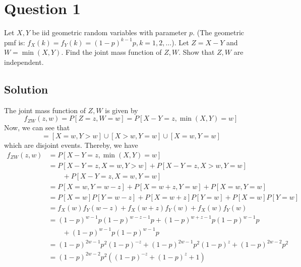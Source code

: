 \section*{Question 1}
\setcounter{section}{1}
\setcounter{equation}{0}

Let \( X, Y \) be iid geometric random variables with parameter \( p \).
(The geometric pmf is: \( f_{X}(k)=f_{Y}(k)={(1-p)}^{k-1} p, k=1,2, \dots \)).
Let \( Z=X-Y \) and \( W=\min (X, Y) \).
Find the joint mass function of \( Z, W \).
Show that \( Z, W \) are independent.

\subsection*{Solution}

The joint mass function of \( Z, W \) is given by
\begin{equation*}
    f_{ZW}(z, w)
    =
    P[Z=z, W=w]
    =
    P[X-Y=z, \min (X, Y)=w]
\end{equation*}
Now, we can see that
\begin{equation}
    [\min (X, Y)=w]
    =
    [X=w, Y>w] \cup [X>w, Y=w] \cup [X=w, Y=w]
\end{equation}
which are disjoint events.
Thereby, we have
\begin{align*}
    f_{ZW}(z, w)
     & =
    P[X-Y=z, \min (X, Y)=w]
    \\ & =
    P[X-Y=z, X=w, Y>w]
    + P[X-Y=z, X>w, Y=w]
    \\ & \qquad
    + P[X-Y=z, X=w, Y=w]
    \\ & =
    P[X=w, Y=w-z]
    + P[X=w+z, Y=w]
    + P[X=w, Y=w]
    \\ & =
    P[X=w] P[Y=w-z]
    + P[X=w+z] P[Y=w]
    + P[X=w] P[Y=w]
    \\ & =
    f_{X}(w) f_{Y}(w-z)
    + f_{X}(w+z) f_{Y}(w)
    + f_{X}(w) f_{Y}(w)
    \\ & =
    {(1-p)}^{w-1} p {(1-p)}^{w-z-1} p
    + {(1-p)}^{w+z-1} p {(1-p)}^{w-1} p
    \\ & \qquad
    + {(1-p)}^{w-1} p {(1-p)}^{w-1} p
    \\ & =
    {(1-p)}^{2w-1} p^{2} {(1-p)}^{-z}
    + {(1-p)}^{2w-1} p^{2} {(1-p)}^{z}
    + {(1-p)}^{2w-2} p^{2}
    \\ & =
    {(1-p)}^{2w-2} p^{2} \left( {(1-p)}^{-z} + {(1-p)}^{z} + 1 \right)
\end{align*}

